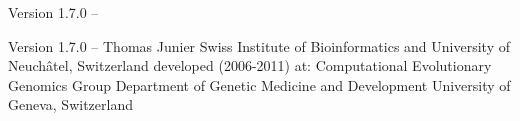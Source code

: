 

\setuppagenumbering[state=stop]

\setuplayout[title]


\startalignment[middle]
Version 1.7.0 -- \currentdate \crlf
\blank[2*big]
 \crlf
{} \crlf
{} \crlf
{}
\stopalignment

\page

\startalignment[center]
Version 1.7.0 -- \currentdate \crlf
\blank[]
Thomas Junier  \crlf
\blank[]
Swiss Institute of Bioinformatics \crlf
and \crlf
University of Neuch\^{a}tel, Switzerland \crlf
\blank[]
developed (2006-2011) at: \crlf
Computational Evolutionary Genomics Group \crlf
Department of Genetic Medicine and Development \crlf
University of Geneva, Switzerland \crlf
\blank[]
\stopalignment

\page
\setuplayout[reset]
